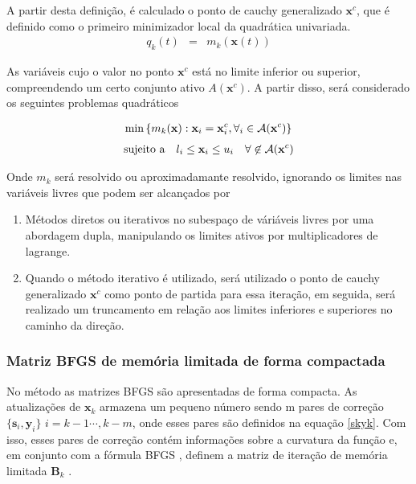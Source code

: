 A partir desta definição, é calculado o ponto de cauchy generalizado $\mathbf{x}^{c}$, que é definido como o primeiro minimizador local da quadrática univariada.
\begin{eqnarray}
 q_{k} (t)& = & m_{k} (\mathbf{x}(t)) 
\end{eqnarray}



    As variáveis cujo o valor no ponto $\mathbf{x}^{c}$ está no limite inferior ou superior, compreendendo um certo conjunto ativo $A(\mathbf{x}^{c})$. A partir disso, será considerado os seguintes problemas quadráticos
    
    \begin{eqnarray}
     \hbox{min}\left \{ m_{k}(\mathbf{x}) : \mathbf{x}_{i}=\mathbf{x}_{i}^{c},\forall_{i} \in \mathcal{A}(\mathbf{x}^{c}) \right \}
     \label{subp1}
    \end{eqnarray}
    \begin{eqnarray}
     \hbox{sujeito a }~~l_{i}\le \mathbf{x}_{i} \le u_{i} ~~~\forall \not\in \mathcal{A}(\mathbf{x}^{c})
     \label{subp2}
     \end{eqnarray}



   Onde $m_{k}$ será resolvido ou aproximadamante resolvido, ignorando os limites nas variáveis livres que podem ser alcançados por 
   
   \begin{enumerate}
    \item Métodos diretos ou iterativos no subespaço de váriáveis livres por uma abordagem dupla, manipulando os limites ativos por multiplicadores de lagrange.
    \item Quando o método iterativo é utilizado, será utilizado o ponto de cauchy generalizado $\mathbf{x}^{c}$ como ponto de partida para essa iteração, em seguida, será realizado um truncamento em relação aos limites inferiores e superiores no caminho da direção.
   \end{enumerate}
   \subsubsection{Matriz BFGS de memória limitada de forma compactada}
   No método as matrizes BFGS são apresentadas de forma compacta. As atualizações de $\mathbf{x}_{k}$ armazena um pequeno número sendo m pares de correção $\{\mathbf{s}_{i},\mathbf{y}_{i}\}$ $ i= k-1 \cdots, k-m $, onde esses pares são definidos na equação \ref{skyk}. Com isso, esses pares de correção contém informações sobre a curvatura da função e, em conjunto com a fórmula BFGS , definem a matriz de iteração de memória limitada $\mathbf{B}_{k}$ \citep{byrd_representations_1996}.
   
